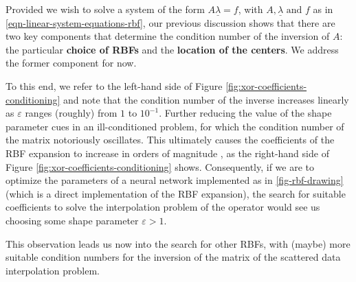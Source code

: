 \documentclass[12pt]{report} %
\newcommand{\tmstrong}[1]{\textbf{#1}}
\newcommand{\tmverbatim}[1]{\text{{\ttfamily{#1}}}}
\begin{document}
Provided we wish to solve a system of the form $A \underline{\lambda} = f$,
with $A, \underline{\lambda} \text{ and } f$ as in
\eqref{eqn-linear-system-equations-rbf}, our previous discussion shows that there
are two key components that determine the condition number of the inversion of
$A$: the particular {\tmstrong{choice of RBFs}} and the {\tmstrong{location of
      the centers}}. We address the former component for now.

To this end, we refer to the left-hand side of Figure
\ref{fig:xor-coefficients-conditioning} and note that the condition number of
the inverse increases linearly as $\varepsilon$ ranges (roughly) from $1$ to
$10^{- 1}$. Further reducing the value of the shape parameter cues in an
ill-conditioned problem, for which the condition number of the matrix
notoriously oscillates. This ultimately causes the coefficients of the RBF
expansion to increase in orders of magnitude {\cite{fornberg2015primer}}, as
the right-hand side of Figure \ref{fig:xor-coefficients-conditioning} shows.
Consequently, if we are to optimize the parameters of a neural network
implemented as in \ref{fig-rbf-drawing} (which is a direct implementation of
the RBF expansion), the search for suitable coefficients to solve the
interpolation problem of the \tmverbatim{xor} operator would see us choosing
some shape parameter $\varepsilon > 1$.

This observation leads us now into the search for other RBFs, with (maybe)
more suitable condition numbers for the inversion of the matrix of the
scattered data interpolation problem.
\end{document}

